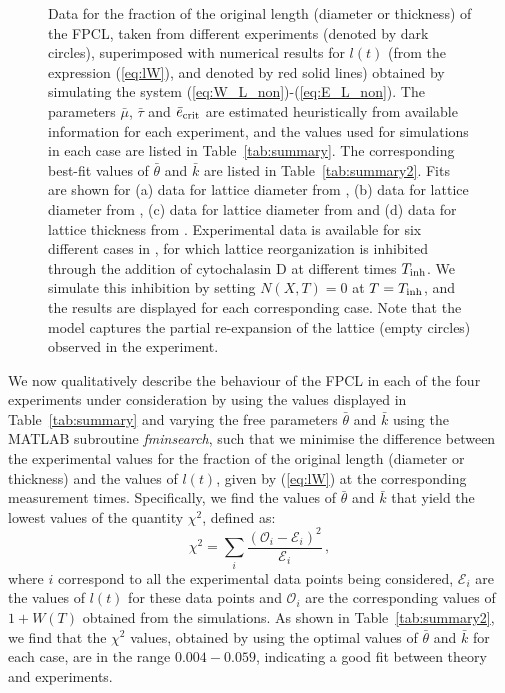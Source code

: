 \begin{figure*}[ht]
\caption{Data for the fraction of the original length (diameter or thickness) of the FPCL, taken from different experiments (denoted by dark circles), superimposed with numerical results for $l(t)$  (from the expression (\ref{eq:lW}), and denoted by red solid lines) obtained by simulating the system (\ref{eq:W_L_non})-(\ref{eq:E_L_non}). The parameters $\bar{\mu}$, $\bar{\tau}$ and $\bar{e}_{\rm crit}$ are estimated heuristically from available information for each experiment, and the values used for simulations in each case are listed in Table~\ref{tab:summary}. The corresponding best-fit values of $\bar{\theta}$ and $\bar{k}$ are listed in Table~\ref{tab:summary2}. Fits are shown for (a) data for lattice diameter from \citet{Bell1979}, (b) data for lattice diameter from \citet{Talas1997}, (c) data  for lattice diameter from \citet{Feng2003} and (d) data for lattice thickness from \citet{Guidry1985}. Experimental data is available for six different cases in \citep{Guidry1985}, for which lattice reorganization is inhibited through the addition of cytochalasin D at different times $T_{\rm inh}$. We simulate this inhibition by setting $N(X,T)=0$ at $T=T_{\rm inh}$, and the results are displayed for each corresponding case. Note that the model captures the partial re-expansion of the lattice (empty circles) observed in the experiment.
}
\label{fig:fits}
\end{figure*}

We now qualitatively describe the behaviour of the FPCL in each of the four experiments under consideration by using the values displayed in Table~\ref{tab:summary} and varying the free parameters $\bar{\theta}$ and $\bar{k}$ using the MATLAB subroutine \emph{fminsearch}, such that we minimise the difference between the experimental values for the fraction of the original length (diameter or thickness) and the values of $l(t)$, given by (\ref{eq:lW}) at the corresponding measurement times. Specifically, we find the values of $\bar{\theta}$ and $\bar{k}$ that yield the lowest values of the quantity $\chi^2$, defined as:
\begin{equation}
\chi^2 = \sum\limits_{i} \frac{\left(\mathscr{O}_{i} - \mathscr{E}_{i}\right)^2}{\mathscr{E}_{i}}\,,
\label{eq:chi2}
\end{equation}
where $i$ correspond to all the experimental data points being considered, $\mathscr{E}_{i}$ are the values of $l(t)$ for these data points and $\mathscr{O}_{i}$ are the corresponding values of $1+W(T)$ obtained from the simulations. As shown in Table~\ref{tab:summary2}, we find that the $\chi^2$ values, obtained by using the optimal values of $\bar{\theta}$ and $\bar{k}$ for each case, are in the range $0.004-0.059$, indicating a good fit between theory and experiments.

